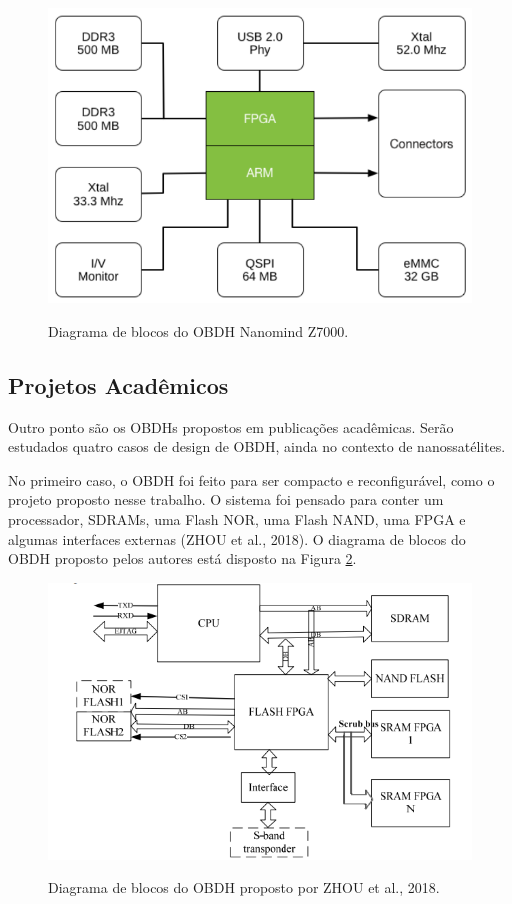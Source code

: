 \begin{figure}[H]
    \centering
    \caption{Diagrama de blocos do OBDH Nanomind Z7000.}
    \includegraphics[scale=0.8]{images/nanomind z7000.png}
    \label{fig:nanomind}
\end{figure}

\subsection{Projetos Acadêmicos}

Outro ponto são os OBDHs propostos em publicações acadêmicas. Serão estudados quatro casos de design de OBDH, ainda no contexto de nanossatélites. 

No primeiro caso, o OBDH foi feito para ser compacto e reconfigurável, como o projeto proposto nesse trabalho. O sistema foi pensado para conter um processador, SDRAMs, uma Flash NOR, uma Flash NAND, uma FPGA e algumas interfaces externas (ZHOU et al., 2018). O diagrama de blocos do OBDH proposto pelos autores está disposto na Figura \ref{fig:zhou}.

\begin{figure}[H]
    \centering
    \caption{Diagrama de blocos do OBDH proposto por ZHOU et al., 2018.}
    \includegraphics[scale=0.8]{images/zhou.png}
    \label{fig:zhou}
\end{figure}

